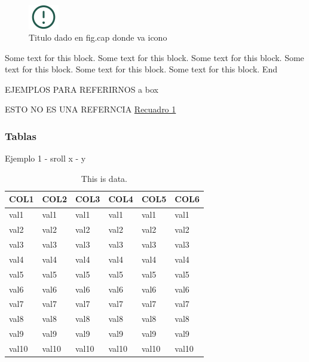 \documentclass[
]{article}
\begin{document}
\begin{figure}
\includegraphics[width=50px,style="float:left; background-color: #f5f5f5; padding-right:1em"]{images-1/important-icon} \caption{Titulo dado en fig.cap donde va icono}\label{fig:testBox}
\end{figure}

\begin{rmdcomment}
Some text for this block. Some text for this block. Some text for this
block. Some text for this block. Some text for this block. Some text for
this block. End
\end{rmdcomment}

EJEMPLOS PARA REFERIRNOS a box

ESTO NO ES UNA REFERNCIA
\protect\hyperlink{fig:testBox}{Recuadro 1}

\hypertarget{tablas}{%
\subsubsection{Tablas}\label{tablas}}

Ejemplo 1 - sroll x - y

\begin{table}

\caption{\label{tab:unnamed-chunk-11}This is data.}
\centering
\fontsize{16}{18}\selectfont
\begin{tabu} to 
\hline
COL1 & COL2 & COL3 & COL4 & COL5 & COL6\\
\hline
val1 & val1 & val1 & val1 & val1 & val1\\
\hline
val2 & val2 & val2 & val2 & val2 & val2\\
\hline
val3 & val3 & val3 & val3 & val3 & val3\\
\hline
val4 & val4 & val4 & val4 & val4 & val4\\
\hline
val5 & val5 & val5 & val5 & val5 & val5\\
\hline
val6 & val6 & val6 & val6 & val6 & val6\\
\hline
val7 & val7 & val7 & val7 & val7 & val7\\
\hline
val8 & val8 & val8 & val8 & val8 & val8\\
\hline
val9 & val9 & val9 & val9 & val9 & val9\\
\hline
val10 & val10 & val10 & val10 & val10 & val10\\
\hline
\end{tabu}
\end{table}
\end{document}
